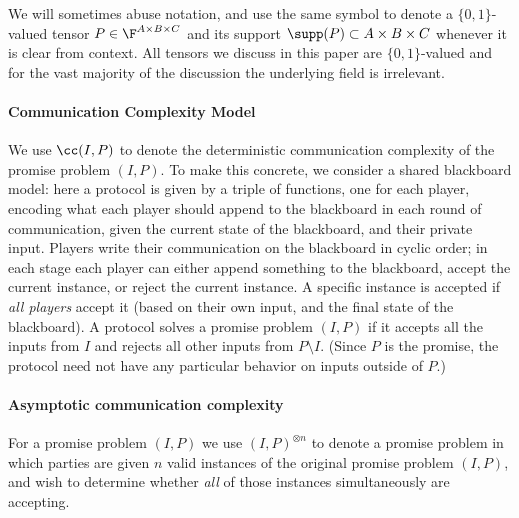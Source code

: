 We will sometimes abuse notation, and use the same symbol to denote a $\{0, 1\}$-valued tensor $P \in \F^{A \times B \times C}$ and its support $\supp(P) \subset A \times B \times C$ whenever it is clear from context. All tensors we discuss in this paper are $\{0,1\}$-valued and for the vast majority of the discussion the underlying field is irrelevant.

\paragraph{Communication Complexity Model}
We use $\cc(I, P)$ to denote the deterministic communication complexity of the promise problem $(I, P)$. To make this concrete, we consider a shared blackboard model: here a protocol is given by a triple of functions, one for each player, encoding what each player should append to the blackboard in each round of communication, given the current state of the blackboard, and their private input. Players write their communication on the blackboard in cyclic order; in each stage each player can either append something to the blackboard, accept the current instance, or reject the current instance. A specific instance is accepted if \emph{all players} accept it (based on their own input, and the final state of the blackboard). A protocol solves a promise problem $(I, P)$ if it accepts all the inputs from $I$ and rejects all other inputs from $P \setminus I$. (Since $P$ is the promise, the protocol need not have any particular behavior on inputs outside of $P$.)

\paragraph{Asymptotic communication complexity}
For a promise problem $(I,P)$ we use $(I, P)^{\otimes n}$ to denote a promise problem in which parties are given $n$ valid instances of the original promise problem $(I, P)$, and wish to determine whether \emph{all} of those instances simultaneously are accepting.

